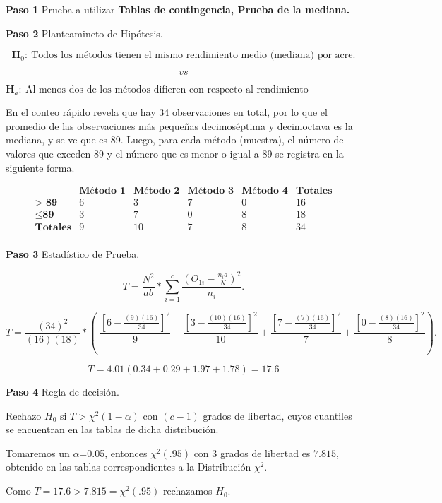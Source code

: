 \documentclass[
  a4paper,
  oneside,
  openany]{book}
\begin{document}
\textbf{Paso 1} Prueba a utilizar \textbf{Tablas de contingencia, Prueba de la mediana.}

\textbf{Paso 2} Planteamineto de Hipótesis.

\[\textbf{H}_0: \ \mbox{Todos los métodos tienen el mismo rendimiento medio (mediana) por acre.}\]

\[vs\]

\[\textbf{H}_a: \ \mbox{Al menos dos de los métodos difieren con respecto al rendimiento medio(mediana) por acre.}\]

En el conteo rápido revela que hay 34 observaciones en total, por lo que el promedio de las observaciones más pequeñas decimoséptima y decimoctava es la mediana, y se ve que es 89. Luego, para cada método (muestra), el número de valores que exceden 89 y el número que es menor o igual a 89 se registra en la siguiente forma.

\[
\begin{array}{c|c|c|c|c|c}
 & \textbf{Método 1} & \textbf{Método 2} & \textbf{Método 3} & \textbf{Método 4}& \textbf{Totales} \\
\hline
\textbf{> 89} & 6 & 3 & 7 & 0 & 16  \\
\hline
\leq \textbf{89} & 3 & 7 & 0 & 8 & 18\\
\hline
\textbf{Totales}  & 9  & 10  & 7 & 8  & 34 \\
\end{array}
\]

\textbf{Paso 3} Estadístico de Prueba.

\[T=\frac{N^2}{ab}*\sum^{c}_{i=1}\frac{(O_{1i}-\frac{n_{i}a}{N})^2}{n_i}.\]

\[T=\frac{(34)^2}{(16)(18)}*\left(\ \frac{\left[6-\frac{(9)(16)}{34}\right]^2}{9}+\frac{\left[3-\frac{(10)(16)}{34}\right]^2}{10}+\frac{\left[7-\frac{(7)(16)}{34}\right]^2}{7}+\frac{\left[0-\frac{(8)(16)}{34}\right]^2}{8} \right).\]

\[T=4.01(0.34+0.29+1.97+1.78) = 17.6\]

\textbf{Paso 4} Regla de decisión.

Rechazo \(H_0\) si \(T> \chi^2(1-\alpha)\) con \((c-1)\) grados de libertad, cuyos cuantiles se encuentran en las tablas de dicha distribución.

Tomaremos un \(\alpha\)=0.05, entonces \(\chi^2(.95)\) con 3 grados de libertad es \(7.815\), obtenido en las tablas correspondientes a la Distribución \(\chi^2\).

Como \(T=17.6 > 7.815=\chi^2(.95)\) rechazamos \(H_0\).
\end{document}
